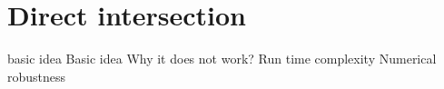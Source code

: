 
\chapter{Direct intersection}
\label{ch:direct_intersection}

basic idea
Basic idea
Why it does not work?
Run time complexity
Numerical robustness
